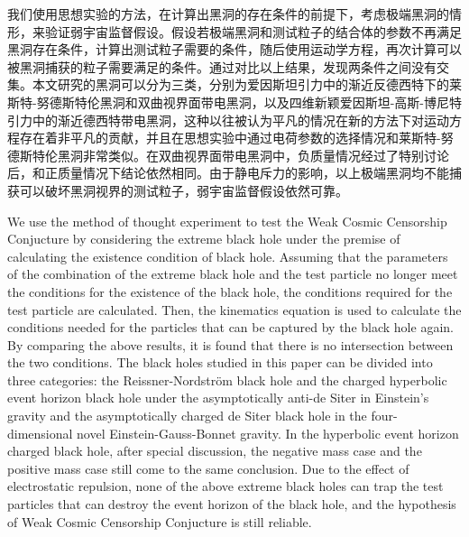 \begin{cabstract}
    我们使用思想实验的方法，在计算出黑洞的存在条件的前提下，考虑极端黑洞的情形，来验证弱宇宙监督假设。假设若极端黑洞和测试粒子的结合体的参数不再满足黑洞存在条件，计算出测试粒子需要的条件，随后使用运动学方程，再次计算可以被黑洞捕获的粒子需要满足的条件。通过对比以上结果，发现两条件之间没有交集。本文研究的黑洞可以分为三类，分别为爱因斯坦引力中的渐近反德西特下的莱斯特-努德斯特伦黑洞和双曲视界面带电黑洞，以及四维新颖爱因斯坦-高斯-博尼特引力中的渐近德西特带电黑洞，这种以往被认为平凡的情况在新的方法下对运动方程存在着非平凡的贡献，并且在思想实验中通过电荷参数的选择情况和莱斯特-努德斯特伦黑洞非常类似。在双曲视界面带电黑洞中，负质量情况经过了特别讨论后，和正质量情况下结论依然相同。由于静电斥力的影响，以上极端黑洞均不能捕获可以破坏黑洞视界的测试粒子，弱宇宙监督假设依然可靠。
\end{cabstract}

\begin{eabstract}
    We use the method of thought experiment to test the Weak Cosmic Censorship Conjucture by considering the extreme black hole under the premise of calculating the existence condition of black hole. Assuming that the parameters of the combination of the extreme black hole and the test particle no longer meet the conditions for the existence of the black hole, the conditions required for the test particle are calculated. Then, the kinematics equation is used to calculate the conditions needed for the particles that can be captured by the black hole again. By comparing the above results, it is found that there is no intersection between the two conditions. The black holes studied in this paper can be divided into three categories: the Reissner-Nordström black hole and the charged hyperbolic event horizon black hole under the asymptotically anti-de Siter in Einstein's gravity and the asymptotically charged de Siter black hole in the four-dimensional novel Einstein-Gauss-Bonnet gravity. In the hyperbolic event horizon charged black hole, after special discussion, the negative mass case and the positive mass case still come to the same conclusion. Due to the effect of electrostatic repulsion, none of the above extreme black holes can trap the test particles that can destroy the event horizon of the black hole, and the hypothesis of Weak Cosmic Censorship Conjucture is still reliable.

\end{eabstract}

\makecover
\tableofcontents
